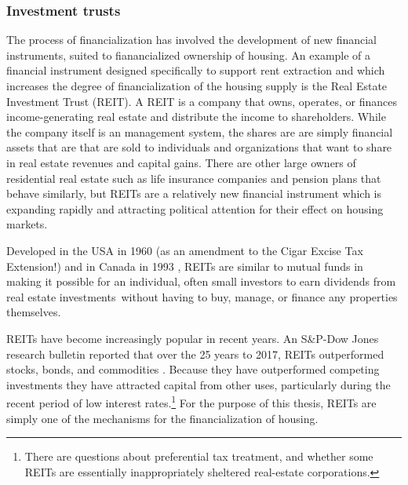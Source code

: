 
\subsubsection{Investment trusts}
The process of financialization has involved the development of new financial instruments, suited to fianancialized ownership of housing. An example of a financial instrument designed specifically to support rent extraction and which increases the degree of financialization of the housing supply is the Real Estate Investment Trust (\gls{REIT}). A REIT is a company that owns, operates, or finances income-generating real estate and distribute the income to shareholders. While the company itself is an management system, the shares are are simply financial assets that are that are sold to individuals and organizations that want to share in real estate revenues and capital gains. There are other large owners of residential real estate such as life insurance companies and pension plans that behave similarly, but REITs are a relatively new financial instrument which is  expanding rapidly and attracting political attention for their effect on housing markets.  %

Developed in the USA  in 1960 (as an amendment to the Cigar Excise Tax Extension!) and in Canada in 1993 \cite{GET_REITsDevelopedDates}, REITs are similar to mutual funds in making it possible for an individual, often small investors to earn dividends from real estate investments without having to buy, manage, or finance any properties themselves. 

REITs have become increasingly popular in recent years. An S\&P-Dow Jones research bulletin reported that over the  25 years to 2017, REITs outperformed stocks, bonds, and commodities \cite{GET-Dow-Jones-research-bulletin}. Because they have outperformed competing investments they have attracted  capital from other uses, particularly during the recent period of low interest rates.\footnote{There are questions about preferential tax treatment, and whether some REITs are essentially inappropriately sheltered real-estate corporations.} For the purpose of this thesis, REITs are simply one of the mechanisms for the financialization of housing.

